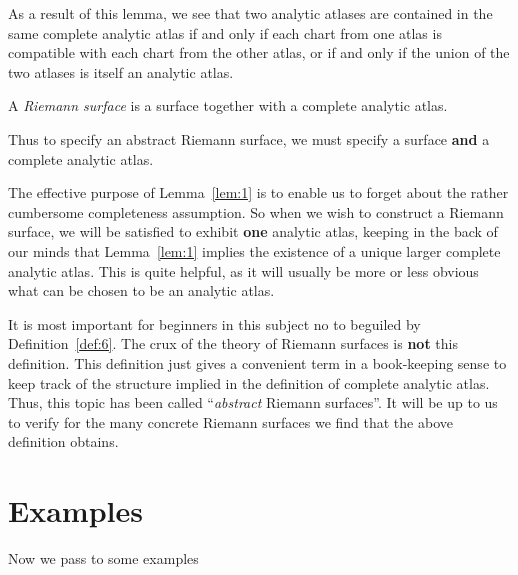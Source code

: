 \documentclass[a4paper,11pt]{article}
\newcounter{topic}
\begin{document}
As a result of this lemma, we see that two analytic atlases are
contained in the same complete analytic atlas if and only if each
chart from one atlas is compatible with each chart from the other
atlas, or if and only if the union of the two atlases is itself an
analytic atlas.

\begin{defn}
  \label{def:6}
  A \emph{Riemann surface} is a surface together with a complete
  analytic atlas.
\end{defn}

Thus to specify an abstract Riemann surface, we must specify a surface
\textbf{and} a complete analytic atlas.

The effective purpose of Lemma~\ref{lem:1} is to enable us to forget
about the rather cumbersome completeness assumption.  So when we wish
to construct a Riemann surface, we will be satisfied to exhibit
\textbf{one} analytic atlas, keeping in the back of our minds that
Lemma~\ref{lem:1} implies the existence of a unique larger complete
analytic atlas.  This is quite helpful, as it will usually be more or
less obvious what can be chosen to be an analytic atlas.

It is most important for beginners in this subject no to beguiled by
Definition~\ref{def:6}.   The crux of the theory of Riemann surfaces
is \textbf{not} this definition.  This definition just gives a
convenient term in a book-keeping sense to keep track of the structure
implied in the definition of complete analytic atlas.  Thus, this
topic has been called ``\emph{abstract} Riemann surfaces''.  It will
be up to us to verify for the many concrete Riemann surfaces we find
that the above definition obtains.

\section{Examples}

Now we pass to some examples
\end{document}
